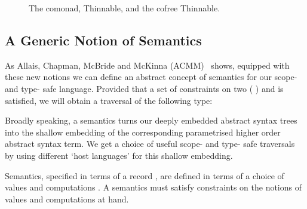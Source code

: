 \begin{figure}[h]
\begin{minipage}{0.45\textwidth}
\end{minipage}\hfill
\begin{minipage}{0.45\textwidth}
\end{minipage}

\begin{minipage}{0.25\textwidth}
\end{minipage}\hfill
\begin{minipage}{0.35\textwidth}
\end{minipage}\hfill
\begin{minipage}{0.30\textwidth}
\end{minipage}

\caption{The  comonad, Thinnable, and the cofree Thinnable.}
\end{figure}

\subsection{A Generic Notion of Semantics}

As Allais, Chapman, McBride and McKinna (ACMM)~\citeyear{allais2017type}
shows, equipped with these new notions we can define an abstract concept
of semantics for our scope- and type- safe language. Provided that a set of
constraints on two ({ })  and  is
satisfied, we will obtain a traversal of the following type:


Broadly speaking, a semantics turns our deeply embedded abstract syntax
trees into the shallow embedding of the corresponding parametrised higher
order abstract syntax term. We get a choice of useful scope- and type- safe
traversals by using different `host languages' for this shallow embedding.

Semantics, specified in terms of a record \semrec{}, are defined in terms
of a choice of values  and computations . A semantics must
satisfy constraints on the notions of values  and computations 
at hand.

\label{section:lamsem}

